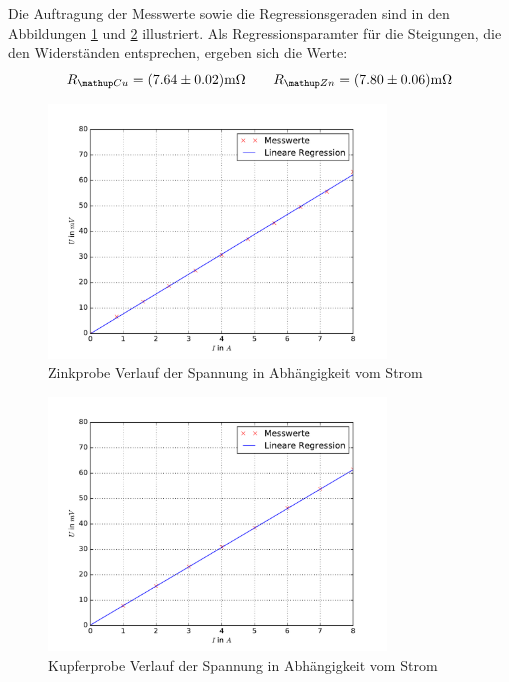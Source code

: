 Die Auftragung der Messwerte sowie die Regressionsgeraden sind in den Abbildungen \ref{fig: uri_zink} und \ref{fig: uri_kupfer} illustriert.
Als Regressionsparamter für die Steigungen, die den Widerständen entsprechen, ergeben sich die Werte:
\begin{equation}
  R\ua{Cu} = (7.64 \pm 0.02)\si{\milli \ohm} \quad \quad R\ua{Zn} = (7.80 \pm 0.06)\si{\milli \ohm}%
  \label{eq: widerstand}
\end{equation}
\FloatBarrier
\begin{figure}
  \centering
  \includegraphics[width=0.8\textwidth]{pics/uri_zink.pdf}
  \caption{Zinkprobe Verlauf der Spannung in Abhängigkeit vom Strom}
  \label{fig: uri_zink}
\end{figure}
\begin{figure}
  \centering
  \includegraphics[width=0.8\textwidth]{pics/uri_kupfer.pdf}
  \caption{Kupferprobe Verlauf der Spannung in Abhängigkeit vom Strom}
  \label{fig: uri_kupfer}
\end{figure}



